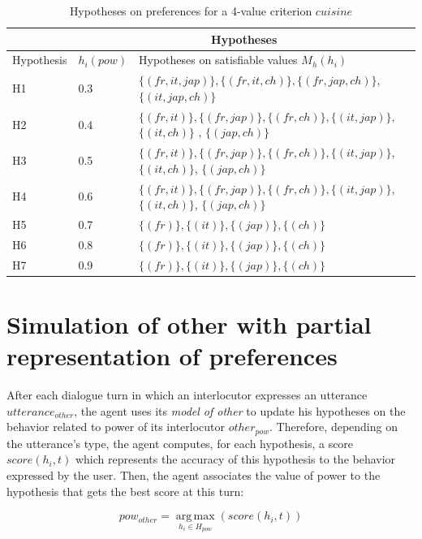 \documentclass[conference, letterpaper]{IEEEtran}
\begin{document}
	\begin{table}[h]
		\centering
		\caption{Hypotheses on preferences for a 4-value criterion $cuisine$}
		\begin{tabular}{ |p{1cm}|p{0.82cm}|p{5.3cm}| }
			\hline
			& \multicolumn{2}{c|}{Hypotheses}  \\
			\hline
			Hypothesis & $h_i(pow)$ & Hypotheses on satisfiable values $ M_h(h_i)$\\
			\hline
			H1&0.3&$\{(fr,it,jap)\} , \{(fr,it,ch)\}, \{(fr,jap,ch)\}$, $\{(it,jap,ch)\}$ \\
			\hline
			H2&0.4&$\{(fr,it)\}, \{(fr,jap)\}, \{(fr,ch)\}, \{(it,jap)\},$ $\{(it,ch)\}$ , $\{(jap,ch)\}$ \\
			\hline
			H3&0.5&$\{(fr,it)\}, \{(fr,jap)\}, \{(fr,ch)\}, \{(it,jap)\}$, $\{(it,ch)\}$, $\{(jap,ch)\}$\\
			\hline
			H4&0.6&$\{(fr,it)\}, \{(fr,jap)\}, \{(fr,ch)\}, \{(it,jap)\}$, $\{(it,ch)\}$, $\{(jap,ch)\}$ \\
			\hline
			H5&0.7&$\{(fr)\}, \{(it)\}, \{(jap)\}, \{(ch)\}$\\
			\hline
			H6&0.8&$\{(fr)\}, \{(it)\}, \{(jap)\}, \{(ch)\}$ \\
			\hline
			H7&0.9&$\{(fr)\}, \{(it)\}, \{(jap)\}, \{(ch)\}$ \\
			\hline
		\end{tabular}		
		\label{tab:hypo}
	\end{table}


	

	\section{Simulation of other with partial representation of preferences}
	
		After each dialogue turn in which an interlocutor expresses an utterance $utterance_{other}$, the agent uses its \emph{model of other} to update his hypotheses on the behavior related to power of its interlocutor $other_{pow}$. 
		Therefore, depending on the utterance's type, the agent computes, for each hypothesis, a score $score(h_i,t)$ which represents the accuracy of this hypothesis to the behavior expressed by the user. Then, the agent associates the value of power to the hypothesis that gets the best score at this turn:
			
			\begin{equation}
			pow_{other} = \operatorname*{arg\,max}_{h_i \in H_{pow}} (score(h_i,t))
			\end{equation}
		
\end{document}
